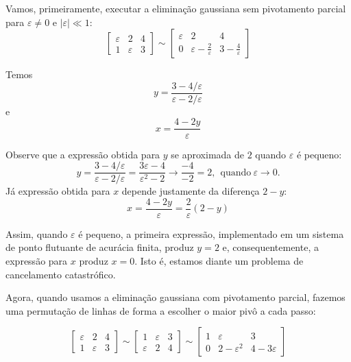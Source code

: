 \begin{sol}
Vamos, primeiramente, executar a eliminação gaussiana sem pivotamento parcial para $\varepsilon \neq 0$ e $|\varepsilon|\ll 1$:
$$\left[\begin{array}{cc|c}
\varepsilon & 2 & 4\\
1 & \varepsilon & 3
\end{array}
\right]\sim\left[\begin{array}{cc|c}
\varepsilon & 2 & 4\\
0 & \varepsilon-\frac{2}{\varepsilon} & 3-\frac{4}{\varepsilon}
\end{array}
\right]
$$

Temos
$$y=\frac{3-4/\varepsilon}{\varepsilon-2/\varepsilon}$$%
e
$$x=\frac{4-2y}{\varepsilon}$$ %

Observe que a expressão obtida para  $y$ se aproximada de $2$ quando $\varepsilon$ é pequeno:
$$y=\frac{3-4/\varepsilon}{\varepsilon-2/\varepsilon}=\frac{3\varepsilon-4}{\varepsilon^2-2} \longrightarrow \frac{-4}{-2}=2, ~~\text{quando}~\varepsilon \to 0.$$
Já expressão obtida para $x$ depende justamente da diferença $2-y$:
$$x=\frac{4-2y}{\varepsilon}=\frac{2}{\varepsilon} (2-y)$$

Assim, quando $\varepsilon$ é pequeno, a primeira expressão, implementado em um sistema de ponto flutuante de acurácia finita, produz $y= 2$ e, consequentemente, a expressão para $x$ produz $x=0$. Isto é, estamos diante um problema de cancelamento catastrófico.

Agora, quando usamos a eliminação gaussiana com pivotamento parcial, fazemos uma permutação de linhas de forma a escolher o maior pivô a cada passo:

$$\left[\begin{array}{cc|c}
\varepsilon & 2 & 4\\
1 & \varepsilon & 3
\end{array}
\right]\sim
\left[\begin{array}{cc|c}
1 & \varepsilon & 3\\
\varepsilon & 2 & 4
\end{array}
\right]\sim
\left[\begin{array}{cc|c}
1 & \varepsilon & 3\\
0 & 2-\varepsilon^2 & 4-3\varepsilon
\end{array}
\right]
$$


\end{sol}
